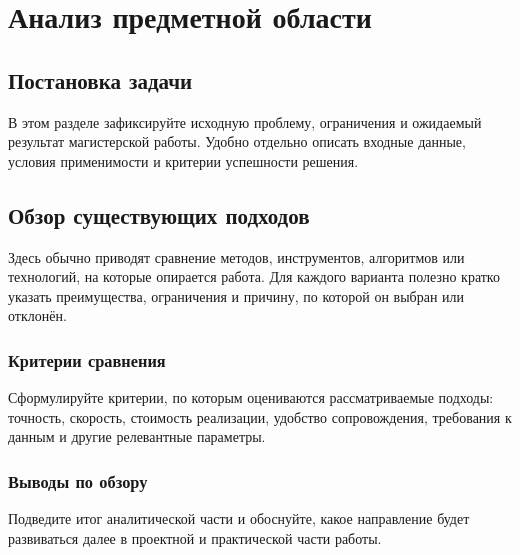 \chapter{Анализ предметной области}\label{ch:analysis}

\section{Постановка задачи}\label{sec:analysis-problem}

В этом разделе зафиксируйте исходную проблему, ограничения и ожидаемый
результат магистерской работы. Удобно отдельно описать входные данные, условия
применимости и критерии успешности решения.

\section{Обзор существующих подходов}\label{sec:analysis-review}

Здесь обычно приводят сравнение методов, инструментов, алгоритмов или
технологий, на которые опирается работа. Для каждого варианта полезно кратко
указать преимущества, ограничения и причину, по которой он выбран или
отклонён.

\subsection{Критерии сравнения}\label{subsec:analysis-criteria}

Сформулируйте критерии, по которым оцениваются рассматриваемые подходы:
точность, скорость, стоимость реализации, удобство сопровождения, требования к
данным и другие релевантные параметры.

\subsection{Выводы по обзору}\label{subsec:analysis-summary}

Подведите итог аналитической части и обоснуйте, какое направление будет
развиваться далее в проектной и практической части работы.
